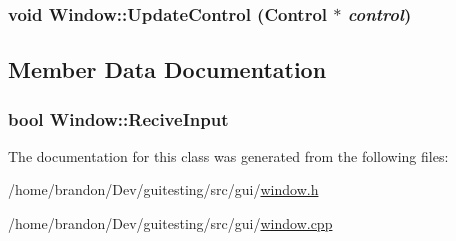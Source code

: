 \hypertarget{class_window_ca9b1f11fc660fe7a36e89daa1886560}{
\subsubsection[{UpdateControl}]{\setlength{\rightskip}{0pt plus 5cm}void Window::UpdateControl ({\bf Control} $\ast$ {\em control})}}
\label{class_window_ca9b1f11fc660fe7a36e89daa1886560}




\subsection{Member Data Documentation}
\hypertarget{class_window_a75fcc9f3abd4dbcfdb6fec9dc9200be}{
\subsubsection[{ReciveInput}]{\setlength{\rightskip}{0pt plus 5cm}bool {\bf Window::ReciveInput}}}
\label{class_window_a75fcc9f3abd4dbcfdb6fec9dc9200be}




The documentation for this class was generated from the following files:\begin{CompactItemize}
\item 
/home/brandon/Dev/guitesting/src/gui/\hyperlink{window_8h}{window.h}\item 
/home/brandon/Dev/guitesting/src/gui/\hyperlink{window_8cpp}{window.cpp}\end{CompactItemize}
